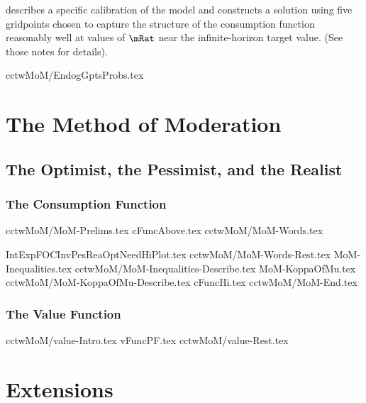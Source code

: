 \documentclass[titlepage,abstract]{\econtex}
\begin{document}
\cite{SolvingMicroDSOPs} describes a specific calibration of the model and
constructs a solution using five gridpoints chosen to 
capture the structure of the consumption function reasonably well at values of
$\mRat$ near the infinite-horizon target value.  (See those notes for details).  

{cctwMoM/EndogGptsProbs.tex}

\hypertarget{The-Method-Of-Moderation}{}
\section{The Method of Moderation}

\hypertarget{The-Optimist-The-Pessimist-and-the-Realist}{}
\subsection{The Optimist, the Pessimist, and the Realist}

\hypertarget{The-Consumption-Function}{}
\subsubsection{The Consumption Function}

{cctwMoM/MoM-Prelims.tex}
{cFuncAbove.tex} 
{cctwMoM/MoM-Words.tex}

{IntExpFOCInvPesReaOptNeedHiPlot.tex}
{cctwMoM/MoM-Words-Rest.tex}
{MoM-Inequalities.tex}
{cctwMoM/MoM-Inequalities-Describe.tex}
{MoM-KoppaOfMu.tex}
{cctwMoM/MoM-KoppaOfMu-Describe.tex}
{cFuncHi.tex}
{cctwMoM/MoM-End.tex}

\subsubsection{The Value Function}

{cctwMoM/value-Intro.tex} %
{vFuncPF.tex} %
{cctwMoM/value-Rest.tex} %

\section{Extensions}
\end{document}
